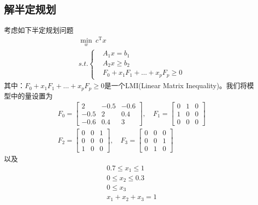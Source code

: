         \subsection{解半定规划}
            \par
            考虑如下半定规划问题
            \begin{align*}
            &\min_w \ c^\mathrm{T}x\\
            &s.t.\left\{
            \begin{aligned}
            &A_1x = b_1\\
            &A_2x \geqslant b_2\\
            &F_0 + x_1F_1+\dots+x_pF_p \geqslant 0
            \end{aligned}
            \right.
            \end{align*}
            其中：$F_0+x_1F_1 + \dots+x_pF_p\geqslant 0$是一个LMI(Linear Matrix Inequality)。我们将模型中的量设置为
            \begin{align*}
            &F_0 =
            \begin{bmatrix}
            2& -0.5 & -0.6\\
            -0.5& 2 & 0.4 \\
            -0.6 & 0.4 & 3
            \end{bmatrix}
            ,\quad
            F_1 =
            \begin{bmatrix}
            0 & 1 & 0\\
            1 & 0 & 0\\
            0 & 0 & 0
            \end{bmatrix}
            \\
            &F_2 =
            \begin{bmatrix}
            0 & 0 & 1\\
            0 & 0 & 0\\
            1 & 0 & 0
            \end{bmatrix}
            ,\quad
            F_3 =
            \begin{bmatrix}
            0 & 0 & 0\\
            0 & 0 & 1\\
            0 & 1 & 0
            \end{bmatrix}
            \end{align*}
            以及
            \begin{align*}
            & 0.7 \leqslant x_1 \leqslant 1\\
            & 0 \leqslant x_2 \leqslant 0.3\\
            & 0 \leqslant x_3\\
            & x_1+x_2+x_3 = 1
            \end{align*}
